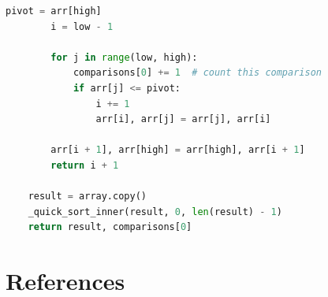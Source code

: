 \documentclass[12pt]{article}
\begin{document}
\begin{lstlisting}[language=Python]
        pivot = arr[high]
        i = low - 1

        for j in range(low, high):
            comparisons[0] += 1  # count this comparison
            if arr[j] <= pivot:
                i += 1
                arr[i], arr[j] = arr[j], arr[i]

        arr[i + 1], arr[high] = arr[high], arr[i + 1]
        return i + 1

    result = array.copy()
    _quick_sort_inner(result, 0, len(result) - 1)
    return result, comparisons[0]
\end{lstlisting}



\newpage
\section{References}
\printbibliography[heading=none]
\end{document}
